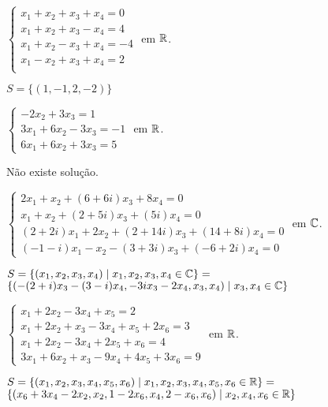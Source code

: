 \documentclass[12pt]{exam}
\begin{document}
\begin{exercicio}\label{sistema_linear_inicio_gauss-jordan}
  $
    \begin{cases}
      x_1 + x_2 + x_3 + x_4 = 0\\
      x_1 + x_2 + x_3 - x_4 = 4\\
      x_1 + x_2 - x_3 + x_4 = -4\\
      x_1 - x_2 + x_3 + x_4 = 2\\
    \end{cases}
  $
  em $\mathbb{R}$.
  \begin{solucao}
    $S = \{(1, -1, 2, -2)\}$
  \end{solucao}
\end{exercicio}

\begin{exercicio}
  $
    \begin{cases}
      -2x_2 + 3x_3 = 1\\
      3x_1 + 6x_2 - 3x_3 = -1\\
      6x_1 + 6x_2 + 3x_3 = 5
    \end{cases}
  $
  em $\mathbb{R}$.
  \begin{solucao}
    Não existe solução.
  \end{solucao}
\end{exercicio}

\begin{exercicio}
  $
    \begin{cases}
      2x_1 + x_2 + (6 + 6i)x_3 + 8x_4 = 0\\
      x_1 + x_2 + (2 + 5i)x_3 + (5  i)x_4 = 0\\
      (2 + 2i)x_1 + 2x_2 + (2 + 14i)x_3 + (14 + 8i)x_4 =0\\
      (-1 - i)x_1 - x_2 - (3 + 3i)x_3 + (-6 + 2i)x_4 = 0
    \end{cases}
  $
  em $\mathbb{C}$.
  \begin{solucao}
    $S = \{(x_1, x_2, x_3, x_4) \mid x_1, x_2, x_3, x_4 \in \mathbb{C}\} = $\\ $\{(-(2 + i)x_3 - (3 - i)x_4,-3ix_3 - 2x_4, x_3, x_4) \mid x_3, x_4 \in \mathbb{C}\}$
  \end{solucao}
\end{exercicio}

\begin{exercicio}
  $
    \begin{cases}
      x_1 + 2x_2 - 3x_4 + x_5 = 2\\
      x_1 + 2x_2 + x_3 - 3x_4 + x_5 + 2x_6 = 3\\
      x_1 + 2x_2 - 3x_4 + 2x_5 + x_6 = 4\\
      3x_1 + 6x_2 + x_3 - 9x_4 + 4x_5 + 3x_6 = 9
    \end{cases}
  $
  em $\mathbb{R}$.
  \begin{solucao}
    $S = \{(x_1, x_2, x_3, x_4, x_5, x_6) \mid x_1, x_2, x_3, x_4, x_5, x_6 \in \mathbb{R}\} = $\\ $\{(x_6 + 3x_4 - 2x_2, x_2, 1 - 2x_6, x_4, 2 - x_6, x_6) \mid x_2, x_4, x_6 \in \mathbb{R}\}$
  \end{solucao}
\end{exercicio}
\end{document}
